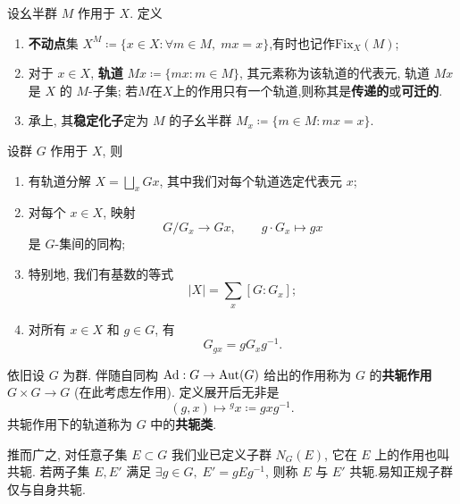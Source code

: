 \begin{definition}
	设幺半群 $M$ 作用于 $X$. 定义
	\begin{enumerate}
		\item \textbf{不动点}集 $X^M \coloneqq \{x \in X: \forall m \in M, \; mx=x \}$,有时也记作$\mathrm{Fix}_X(M)$;
		\item 对于 $x \in X$, \textbf{轨道} $Mx \coloneqq \{mx : m \in M \}$, 其元素称为该轨道的代表元, 轨道 $Mx$ 是 $X$ 的 $M$-子集; 若$M$在$X$上的作用只有一个轨道,则称其是\textbf{传递的}或\textbf{可迁的}.
		\item 承上, 其\textbf{稳定化子}定为 $M$ 的子幺半群 $M_x \coloneqq \{m \in M : mx=x\}$.
	\end{enumerate}
\end{definition}
\begin{theorem}[轨道分解定理]\label{prop:orbit-decomp}
	设群 $G$ 作用于 $X$, 则
	\begin{enumerate}
		\item 有轨道分解 $X = \bigsqcup_x Gx$, 其中我们对每个轨道选定代表元 $x$;
		\item 对每个 $x \in X$, 映射
		\[
			G/G_x \to Gx,\qquad g \cdot G_x \mapsto gx
		\]
		是 $G$-集间的同构;
		\item 特别地, 我们有基数的等式
		\[ |X| = \sum_x \left[ G: G_x \right]; \]
		\item 对所有 $x \in X$ 和 $g \in G$, 有
		\[ G_{gx} = g G_x g^{-1}. \]
	\end{enumerate}
\end{theorem}
\begin{definition}\label{def:conj-action} 
	依旧设 $G$ 为群. 伴随自同构 $\mathrm{Ad}: G \to \operatorname{\mathrm{Aut}}(G)$ 给出的作用称为 $G$ 的\textbf{共轭作用} $G \times G \to G$ (在此考虑左作用). 定义展开后无非是
	\[ (g, x) \longmapsto {}^g x \coloneqq gxg^{-1}. \]
	共轭作用下的轨道称为 $G$ 中的\textbf{共轭类}.
\end{definition}

推而广之, 对任意子集 $E \subset G$ 我们业已定义子群 $N_G(E)$, 它在 $E$ 上的作用也叫共轭. 若两子集 $E, E'$ 满足 $\exists g \in G, \; E' = gEg^{-1}$, 则称 $E$ 与 $E'$ 共轭.易知正规子群仅与自身共轭.

